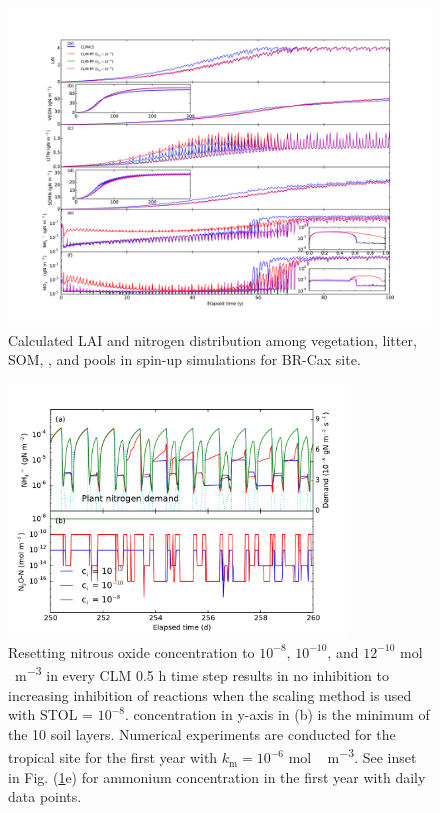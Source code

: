 \documentclass[gmd, manuscript]{copernicus}
\begin{document}
\begin{figure}[t]
\includegraphics[width=18cm]{../figs/fig12/cax300yl.pdf}
\caption{Calculated LAI and nitrogen distribution among vegetation, litter,
SOM, , and  pools in spin-up simulations for BR-Cax
site. }
\label{fig:cax300yl}
\end{figure}


\begin{figure}[t]
\includegraphics[width=0.8\textwidth]{../figs/fig18/cax1yn2o.pdf}
\caption{Resetting nitrous oxide concentration to $10^{-8}$, $10^{-10}$, and $12^{-10}$ \unit{mol\,m^{-3}} in every CLM 0.5 h time step results in no inhibition to increasing inhibition of reactions when the scaling method is used with STOL = $10^{-8}$.  concentration in y-axis in (b) is the minimum of the 10 soil layers. Numerical experiments are conducted for the tropical site for the first year with $k_\text{m}=10^{-6}$ \unit{mol\,m^{-3}}. See inset in Fig. (\ref{fig:cax300yl}e) for ammonium concentration in the first year with daily data points.}
\label{fig:cax1yn2o}
\end{figure}
\end{document}
